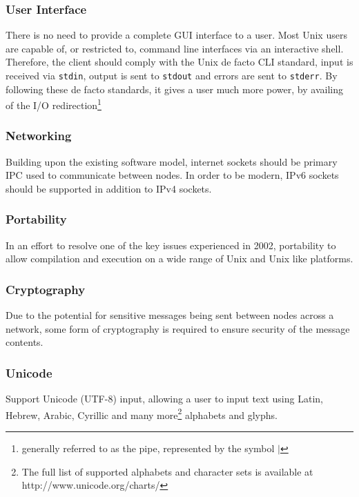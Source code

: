 
\subsubsection{User Interface}

There is no need to provide a complete GUI interface to a user. Most
Unix users are capable of, or restricted to, command line interfaces via
an interactive shell. Therefore, the client should comply with the 
Unix de facto CLI standard, input is received via \verb!stdin!, output
is sent to \verb!stdout! and errors are sent to \verb!stderr!. By
following these de facto standards, it gives a user much more power, by
availing of the 
I/O redirection\footnote{generally referred to as the pipe, represented by the symbol $\mid$}

\subsubsection{Networking}

Building upon the existing software model, internet sockets should be 
primary IPC used to communicate between nodes. In order to be modern,
IPv6 sockets should be supported in addition to IPv4 sockets.

\subsubsection{Portability}

In an effort to resolve one of the key issues experienced in 2002, 
portability to allow compilation and execution on a wide range of Unix
and Unix like platforms.

\subsubsection{Cryptography}

Due to the potential for sensitive messages being sent between nodes
across a network, some form of cryptography is required to ensure 
security of the message contents.

\subsubsection{Unicode}

Support Unicode (UTF-8) input, allowing a user to input text using 
Latin, Hebrew, Arabic, Cyrillic
and many more\footnote{The full list of supported alphabets and character sets is available at http://www.unicode.org/charts/}
alphabets and glyphs. 

